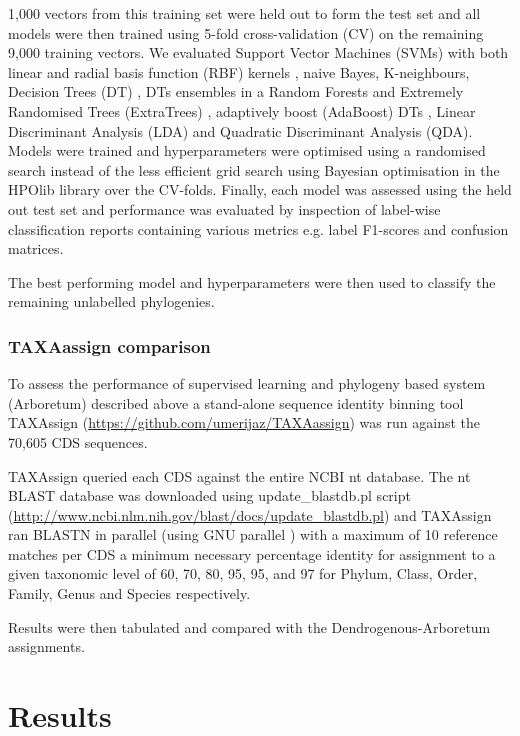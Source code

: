 1,000 vectors from this training set were held out to form the test set and all models were then trained
using 5-fold cross-validation (CV) on the remaining 9,000 training vectors. 
We evaluated Support Vector Machines (SVMs) with both linear and radial basis function (RBF) kernels
\citep{Vapnik1963}, naive Bayes, K-neighbours, 
Decision Trees (DT) \citep{Quinlan1986}, DTs ensembles in a Random Forests \citep{Breiman2001}
and Extremely Randomised Trees (ExtraTrees) \citep{Geurts2006},
adaptively boost (AdaBoost) DTs \citep{Freund1997}, Linear Discriminant Analysis (LDA) and
Quadratic Discriminant Analysis (QDA).
Models were trained and hyperparameters were optimised using a randomised search instead of the less
efficient grid search \citep{Bergstra2012} using Bayesian optimisation in the HPOlib library \citep{Eggensperger2013,Komer2014} over the CV-folds.  
Finally, each model was assessed using the held out test set and performance was 
evaluated by inspection of label-wise classification reports containing various
metrics e.g. label F1-scores and confusion matrices.
 
The best performing model and hyperparameters were then used to classify the remaining
unlabelled phylogenies.

\subsubsection{TAXAassign comparison}

To assess the performance of supervised learning and phylogeny based system (Arboretum)
described above a stand-alone sequence identity binning tool TAXAssign (\url{https://github.com/umerijaz/TAXAassign}) was run 
against the 70,605 CDS sequences.  

TAXAssign queried each CDS against the entire NCBI nt database.
The nt BLAST database was downloaded using update\_blastdb.pl script (\url{http://www.ncbi.nlm.nih.gov/blast/docs/update_blastdb.pl})
and TAXAssign ran BLASTN in parallel (using GNU parallel \citep{Tange2011a})
with a maximum of 10 reference matches
per CDS a minimum necessary percentage identity for assignment
to a given taxonomic level of 60, 70, 80, 95, 95, and 97
for Phylum, Class, Order, Family, Genus and Species respectively. 

Results were then tabulated and compared with the Dendrogenous-Arboretum assignments.

\section{Results} 

